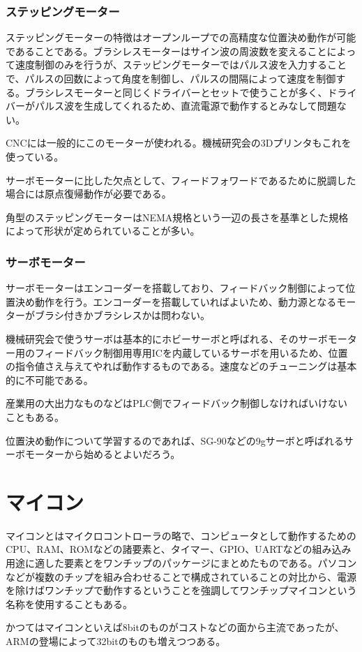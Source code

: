\documentclass[a4paper,titlepage,here]{ujarticle}
\begin{document}
\subsubsection{ステッピングモーター}
ステッピングモーターの特徴はオープンループでの高精度な位置決め動作が可能であることである。ブラシレスモーターはサイン波の周波数を変えることによって速度制御のみを行うが、ステッピングモーターではパルス波を入力することで、パルスの回数によって角度を制御し、パルスの間隔によって速度を制御する。ブラシレスモーターと同じくドライバーとセットで使うことが多く、ドライバーがパルス波を生成してくれるため、直流電源で動作するとみなして問題ない。

CNCには一般的にこのモーターが使われる。機械研究会の3Dプリンタもこれを使っている。

サーボモーターに比した欠点として、フィードフォワードであるために脱調した場合には原点復帰動作が必要である。

角型のステッピングモーターはNEMA規格という一辺の長さを基準とした規格によって形状が定められていることが多い。
\subsubsection{サーボモーター}
サーボモーターはエンコーダーを搭載しており、フィードバック制御によって位置決め動作を行う。エンコーダーを搭載していればよいため、動力源となるモーターがブラシ付きかブラシレスかは問わない。

機械研究会で使うサーボは基本的にホビーサーボと呼ばれる、そのサーボモーター用のフィードバック制御用専用ICを内蔵しているサーボを用いるため、位置の指令値さえ与えてやれば動作するものである。速度などのチューニングは基本的に不可能である。

産業用の大出力なものなどはPLC側でフィードバック制御しなければいけないこともある。

位置決め動作について学習するのであれば、SG-90などの9gサーボと呼ばれるサーボモーターから始めるとよいだろう。
\section{マイコン}
マイコンとはマイクロコントローラの略で、コンピュータとして動作するためのCPU、RAM、ROMなどの諸要素と、タイマー、GPIO、UARTなどの組み込み用途に適した要素とをワンチップのパッケージにまとめたものである。パソコンなどが複数のチップを組み合わせることで構成されていることの対比から、電源を除けばワンチップで動作するということを強調してワンチップマイコンという名称を使用することもある。

かつてはマイコンといえば8bitのものがコストなどの面から主流であったが、ARMの登場によって32bitのものも増えつつある。
\end{document}
